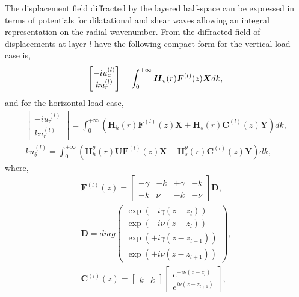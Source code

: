\documentclass[preprint,5p,times]{elsarticle}
\begin{document}
The displacement field diffracted by the layered half-space can be expressed in terms of potentials for dilatational and shear waves \cite{Knopoff1964} \cite{Aki1980} allowing an integral representation on the radial wavenumber. From \cite{Sanchez-sesma2011a} the diffracted field of displacements at layer $l$ have the following compact form for the vertical load case is,
\begin{equation}
		\left[\begin{matrix} -i u_z^{(l)} \\
		k u_r^{(l)} \end{matrix} \right] = \int_{0}^{+ \infty} \boldsymbol{H}_v(r)\boldsymbol{F}^{(l)}(z) \boldsymbol{X} dk,\\
		\label{eqUdifver}
\end{equation}
and for the horizontal load case,
\begin{equation}
\begin{aligned}
\left[\begin{matrix} -i u_z^{(l)} \\
k u_r^{(l)} \end{matrix} \right] = \int_{0}^{+ \infty} \left(\boldsymbol{H}_h(r) \boldsymbol{F}^{(l)}(z) \boldsymbol{X} + \boldsymbol{H}_s(r) \boldsymbol{C}^{(l)}(z) \boldsymbol{Y}\right) dk, \\
k u_\theta^{(l)} = \int_{0}^{+ \infty} \left(\boldsymbol{H}_h^\theta(r) \boldsymbol{U} \boldsymbol{F}^{(l)}(z) \boldsymbol{X} - \boldsymbol{H}_s^\theta(r) \boldsymbol{C}^{(l)}(z) \boldsymbol{Y}\right) dk,
\end{aligned}
\label{eqUdifhor}
\end{equation}
where,
\begin{equation}
	\begin{aligned}
\boldsymbol{F}^{(l)}(z) = \left[\begin{matrix}
	-\gamma & -k & +\gamma & -k \\
	-k  & \nu & -k  & -\nu 
	\end{matrix} \right] \boldsymbol{D},\\
\boldsymbol{D} = diag\left(\begin{matrix}
	\exp(-i\gamma (z-z_l)) \\
	\exp(-i \nu (z-z_l)) \\
	\exp(+i\gamma(z-z_{l+1})) \\
	\exp(+i \nu (z-z_{l+1})) 
	\end{matrix} \right), \\
\boldsymbol{C}^{(l)}(z) = \left[\begin{matrix}
k & k
\end{matrix}\right] \left[\begin{matrix}
e^{-i \nu (z-z_l)} \\ e^{i \nu (z-z_{l+1})}
\end{matrix} \right],\\
	\end{aligned}
\end{equation}
\end{document}
